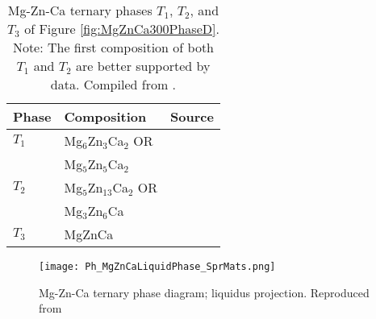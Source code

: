 \documentclass[a4paper,12pt,oneside]{report}%
\begin{document}
\begin{table}[H]
	\centering
	\begin{tabular}{ l l l }
		\toprule
		Phase & Composition & Source \\
		\midrule
		$T_{1}$ & Mg$_{6}$Zn$_{3}$Ca$_{2}$ OR & \cite{Clark1961} \\
		& Mg$_{5}$Zn$_{5}$Ca$_{2}$ & \\
		$T_{2}$	& Mg$_{5}$Zn$_{13}$Ca$_{2}$ OR & \cite{Clark1961} \\
		& Mg$_{3}$Zn$_{6}$Ca & \\
		$T_{3}$	& MgZnCa & \cite{Schulze1961} \\
		\bottomrule
	\end{tabular}
	\caption[Mg-Zn-Ca ternary phases $T_{1}$, $T_{2}$, and $T_{3}$ of Figure \ref{fig:MgZnCa300PhaseD}. Note: The first composition of both $T_{1}$ and $T_{2}$ are better supported by data.]{Mg-Zn-Ca ternary phases $T_{1}$, $T_{2}$, and $T_{3}$ of Figure \ref{fig:MgZnCa300PhaseD}. Note: The first composition of both $T_{1}$ and $T_{2}$ are better supported by data. Compiled from \cite{Clark1961, Schulze1961}.}
	\label{tab:SputterParameters}
\end{table}

\begin{figure}[htb]
	\centering
	\texttt{[image: Ph\_MgZnCaLiquidPhase\_SprMats.png]}
	\caption[Mg-Zn-Ca ternary phase diagram; liquidus projection.]{Mg-Zn-Ca ternary phase diagram; liquidus projection. Reproduced from \cite{Paris1933}}
	\label{fig:MgZnCaLiquidPhaseD}
\end{figure}
\end{document}
